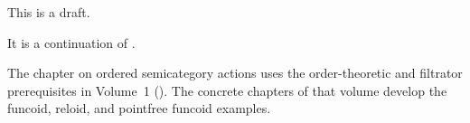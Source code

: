 \documentclass[english,reqno,12pt]{amsbook}
\begin{document}

\maketitle

\tableofcontents{}

This is a draft.

It is a continuation of \cite{volume-1}.

The chapter on ordered semicategory actions uses the
order-theoretic and filtrator prerequisites in Volume~1
(\cite{volume-1}). The concrete chapters of that volume develop
the funcoid, reloid, and pointfree funcoid examples.






\end{document}
